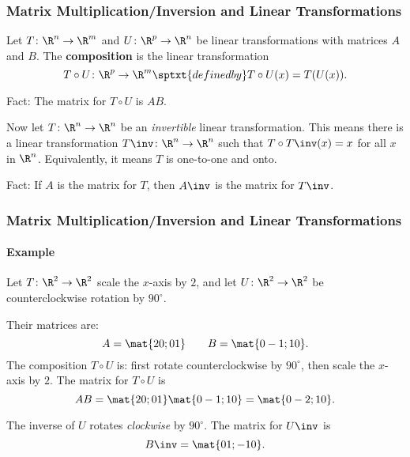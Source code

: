 
\begin{frame}
\frametitle{Matrix Multiplication/Inversion and Linear Transformations}

Let $T\colon\R^n\to\R^m$ and $U\colon\R^p\to\R^n$ be linear transformations with
matrices $A$ and $B$.  The \textbf{composition} is the linear transformation
\[ T\circ U\colon\R^p\to\R^m \sptxt{defined by} T\circ U(x) = T(U(x)). \]
\begin{center}
\end{center}

\pause
\alert{Fact:} The matrix for $T\circ U$ is $AB$.

\pause\bigskip
Now let $T\colon\R^n\to\R^n$ be an \emph{invertible} linear transformation.
\pause
This means there is a linear transformation $T\inv\colon\R^n\to\R^n$ such that
$T\circ T\inv(x) = x$ for all $x$ in $\R^n$.
\pause
Equivalently, it means $T$ is one-to-one and onto.

\pause\medskip
\alert{Fact:} If $A$ is the matrix for $T$, then $A\inv$ is the matrix for
$T\inv$.

\end{frame}



\begin{frame}
\frametitle{Matrix Multiplication/Inversion and Linear Transformations}
\framesubtitle{Example}

Let $T\colon\R^2\to\R^2$ scale the $x$-axis by $2$, and let $U\colon\R^2\to\R^2$
be counterclockwise rotation by $90^\circ$.

\medskip
\begin{webonly}
Their matrices are:
\[ A = \mat{2 0; 0 1} \qquad B = \mat{0 -1; 1 0}. \]
The composition $T\circ U$ is:
first rotate counterclockwise by $90^\circ$, then scale the $x$-axis by $2$.
The matrix for $T\circ U$ is
\[ AB = \mat{2 0; 0 1}\mat{0 -1; 1 0} = \mat{0 -2; 1 0}.  \]

\bigskip
The inverse of $U$ rotates \emph{clockwise} by $90^\circ$.
The matrix for $U\inv$ is
\[ B\inv = \mat{0 1; -1 0}. \]
\end{webonly}

\end{frame}


